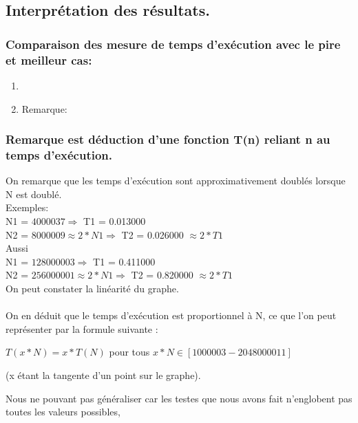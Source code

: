 \documentclass[12pt]{article}
\begin{document}
\subsection{Interprétation des résultats.}
\subsubsection{Comparaison des mesure de temps d'exécution avec le pire et meilleur cas:}
\begin{enumerate}
	\item 

	\item Remarque:
	\\

\end{enumerate}

\subsubsection{Remarque est déduction d'une fonction T(n) reliant n au temps d'exécution.}

On remarque que les temps d'exécution sont approximativement doublés lorsque N est doublé.
\\

\color{blue}
Exemples:
\color{black} 
\\
N1 = $4000037  \Rightarrow  $  T1 = 0.013000
\\
N2 = $8000009 \approx 2 * N1  \Rightarrow  $  T2 = 0.026000 $\approx 2 * T1 $
\\

Aussi
\\
N1 = $128000003 \Rightarrow $  T1 = 0.411000
\\
N2 = $256000001 \approx 2 * N1 \Rightarrow $  T2 = 0.820000 $\approx 2 * T1 $
\\

On peut constater la linéarité du graphe. 
\\
\\
On en déduit que le temps d'exécution est proportionnel à N, ce que l'on peut représenter par la formule suivante
: 
\begin{center}

	$T(x*N) = x*T(N)$ pour tous $ x*N \in [1000003 - 2048000011] $	
	

(x étant la tangente d'un point sur le graphe).
\end{center}

Nous ne pouvant pas généraliser car les testes que nous avons fait n'englobent pas toutes les valeurs possibles, 
	
\end{document}
